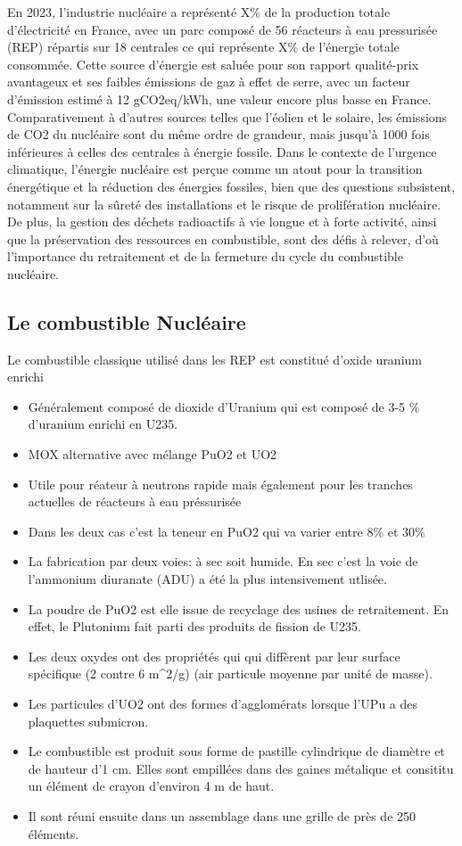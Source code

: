 En 2023, l'industrie nucléaire a représenté X\% de la production totale d'électricité en France, avec un parc composé de 56 réacteurs à eau pressurisée (REP) répartis sur 18 centrales ce qui représente X\% de l'énergie totale consommée. Cette source d'énergie est saluée pour son rapport qualité-prix avantageux et ses faibles émissions de gaz à effet de serre, avec un facteur d'émission estimé à 12 gCO2eq/kWh, une valeur encore plus basse en France. Comparativement à d'autres sources telles que l'éolien et le solaire, les émissions de CO2 du nucléaire sont du même ordre de grandeur, mais jusqu'à 1000 fois inférieures à celles des centrales à énergie fossile. Dans le contexte de l'urgence climatique, l'énergie nucléaire est perçue comme un atout pour la transition énergétique et la réduction des énergies fossiles, bien que des questions subsistent, notamment sur la sûreté des installations et le risque de prolifération nucléaire. De plus, la gestion des déchets radioactifs à vie longue et à forte activité, ainsi que la préservation des ressources en combustible, sont des défis à relever, d'où l'importance du retraitement et de la fermeture du cycle du combustible nucléaire.

\subsection{Le combustible Nucléaire}
Le combustible classique utilisé dans les REP est constitué d'oxide uranium enrichi

\begin{itemize}
    \item Généralement composé de dioxide d'Uranium qui est composé de 3-5 \% d'uranium enrichi en U235.
    \item MOX alternative avec mélange PuO2 et UO2
    \item Utile pour réateur à neutrons rapide mais également pour les tranches actuelles de réacteurs à eau préssurisée
    \item Dans les deux cas c'est la teneur en PuO2 qui va varier entre 8\% et 30\%
    \item La fabrication par deux voies: à sec soit humide. En sec c'est la voie de l'ammonium diuranate (ADU) a été la plus intensivement utlisée.
    \item La poudre de PuO2 est elle issue de recyclage des usines de retraitement. En effet, le Plutonium fait parti des produits de fission de U235.
    \item Les deux oxydes ont des propriétés qui qui diffèrent par leur surface spécifique (2 contre 6 m^2/g) (air particule moyenne par unité de masse).
    \item Les particules d'UO2 ont des formes d'agglomérats lorsque l'UPu a des plaquettes submicron.
    \item Le combustible est produit sous forme de pastille cylindrique de diamètre et de hauteur d'1 cm. Elles sont empillées dans des gaines métalique et consititu un élément de crayon d'environ 4 m de haut.
    \item Il sont réuni ensuite dans un assemblage dans une grille de près de 250 éléments.
\end{itemize}

